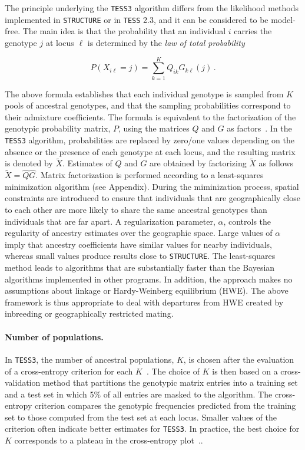 The principle underlying the {\tt TESS3} algorithm differs from the likelihood methods implemented in {\tt STRUCTURE}  or in  {\tt TESS} 2.3, and it can be considered to be model-free. The main idea is that the probability that an individual $i$ carries the genotype $j$ at locus $\ell$ is determined by the {\it law of total probability}

$$
P(X_{i\ell} = j) = \sum_{k = 1}^K Q_{ik}  G_{k\ell}(j)  \,. 
$$


The above formula establishes that each individual genotype is sampled from $K$ pools of ancestral genotypes, and that the sampling probabilities correspond to their admixture coefficients. The formula is equivalent to the factorization of the genotypic probability matrix, $P$, using the matrices $Q$ and $G$ as factors~\citep{frichot2014fast}. In the {\tt TESS3} algorithm, probabilities are replaced by zero/one values depending on the absence or the presence of each genotype at each locus, and the resulting matrix is denoted by $\tilde{X}$. Estimates of $Q$ and $G$ are obtained by factorizing $\tilde{X}$  as follows $\tilde{X} = \hat Q \hat G$. Matrix factorization is performed according to a least-squares minimization algorithm (see Appendix). During the miminization process, spatial constraints are introduced  to ensure that individuals that are geographically close to each other are more likely to share the same ancestral genotypes than individuals that are far apart. A regularization parameter, $\alpha$, controls the regularity of ancestry estimates over the geographic space. Large values of $\alpha$ imply that ancestry coefficients have similar values for nearby individuals, whereas small values produce results close to {\tt STRUCTURE}. The least-squares method leads to algorithms that are substantially faster than the Bayesian algorithms implemented in other programs.  In addition, the approach makes no assumptions about linkage or Hardy-Weinberg equilibrium (HWE). The above framework is thus appropriate to deal with departures from HWE created by inbreeding or geographically restricted mating. 

  

\paragraph{Number of populations.} 

In {\tt TESS3}, the number of ancestral populations, $K$, is chosen after the evaluation of a cross-entropy criterion for each $K$~\citep{frichot2014fast}. The choice of $K$ is then based on a cross-validation method that  partitions the genotypic matrix entries into a training set and a test set in which 5$\%$ of all entries are masked to the algorithm. The  cross-entropy criterion compares the genotypic frequencies predicted from the training set to those computed from the test set at each locus. Smaller values of the criterion often indicate better estimates for {\tt TESS3}. In practice, the best choice for $K$ corresponds to a plateau in the cross-entropy plot~\citep{frichot2015lea}..  

